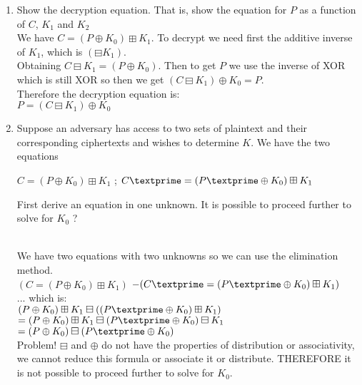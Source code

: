 \documentclass[12pt]{article}
\begin{document}
\begin{enumerate}
		
	\begin{enumerate}
		\item{Show the decryption equation. That is, show the equation for $P$ as a function of $C$, $K_1$ and $K_2$} \\
			We have $ C = (P \oplus K_0 ) \boxplus K_1$. To decrypt we need first the additive inverse of $K_1$, which is $(\boxminus K_1)$. \\Obtaining $ C \boxminus K_1 = (P \oplus K_0 ) $. Then to get $P$ we use the inverse of XOR which is still XOR so then we get $ (C \boxminus K_1) \oplus K_0 = P  $. \\ Therefore the decryption equation is: \\ $ P = (C \boxminus K_1) \oplus K_0  $
		
		\item{Suppose an adversary has access to two sets of plaintext and their corresponding ciphertexts and wishes to determine $K$. We have the two equations \begin{center}  $C = (P \oplus K_0 ) \boxplus K_1$  ;  $C\textprime  = (P\textprime \oplus K_0 ) \boxplus K_1 $ \end{center} First derive an equation in one unknown. It is possible to proceed further to solve for $K_0$ ?} \\
		We have two equations with two unknowns so we can use the elimination method. \\
		$ (C = (P \oplus K_0 ) \boxplus K_1)$ $-(C\textprime  = (P\textprime \oplus K_0 ) \boxplus K_1)$ \\... which is:\\
	$(P \oplus K_0 ) \boxplus K_1 \boxminus ((P\textprime \oplus K_0 ) \boxplus K_1)$ \\
	$= (P \oplus K_0 ) \boxplus K_1\boxminus (P\textprime \oplus K_0 ) \boxminus K_1$ \\
	$= (P \oplus K_0 )  \boxminus (P\textprime \oplus K_0 ) $ \\
	Problem! $\boxminus$ and $\oplus $ do not have the properties of distribution or associativity, we cannot reduce this formula or associate it or distribute. THEREFORE it is not possible to proceed further to solve for  $K_0$.
		
	\end{enumerate}
	\vspace{40pt}
	

    
\end{enumerate}
\end{document}
